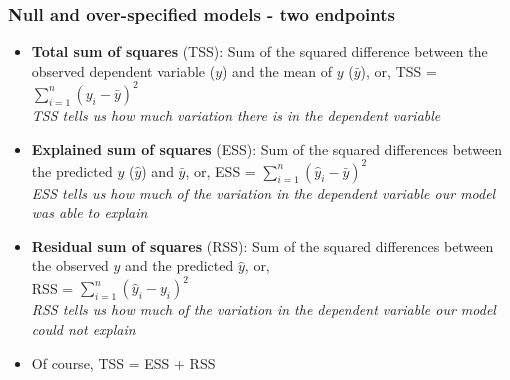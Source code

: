 \documentclass[aspectratio=43]{beamer}
\begin{document}

\begin{frame}[T]
	
\frametitle{Null and over-specified models - two endpoints}

\begin{itemize} \itemsep6pt

\item {\bf Total sum of squares} (TSS): Sum of the squared difference between the observed dependent variable ($y$) and the mean of $y$ ($\bar{y}$), or,		
 TSS = $\sum_{i=1}^{n}(y_i - \bar{y})^2$\\
{\it TSS tells us how much variation there is in the dependent variable}

\item {\bf Explained sum of squares} (ESS): Sum of the squared 
differences between the predicted $y$ ($\hat{y}$) and $\bar{y}$, or,
ESS = $\sum_{i=1}^{n} (\hat{y}_i - \bar{y})^2$\\

{\it ESS tells us how much of the variation in the dependent variable 
our model was able to explain}

\item {\bf Residual sum of squares} (RSS): Sum of the squared 
differences between the observed $y$ and the predicted $\hat{y}$, or, \\

RSS = $\sum_{i=1}^{n} (\hat{y}_i - y_i)^2$\\

{\it RSS tells us how much of the variation in the dependent variable 
our model could not explain}

\item Of course, TSS = ESS + RSS

\end{itemize}


\end{frame}
\end{document}
